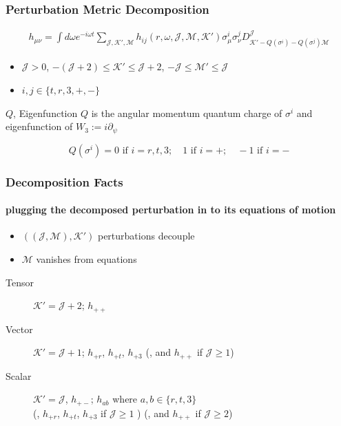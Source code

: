 \documentclass[xcolor=dvipsnames]{beamer}
\begin{document}
\begin{frame}
  \frametitle{Perturbation Metric Decomposition}

  \begin{align*}
    h_{\mu\nu} = \int d\omega e^{-i\omega t} \sum_{\mathcal{J}, \mathcal{K}', \mathcal{M}} h_{i j}(r,\omega, \mathcal{J},\mathcal{M},\mathcal{K}') \sigma^i_{\mu} \sigma^j_{\nu} D_{\mathcal{K'}-Q(\sigma^{i})-Q(\sigma^{j}) \mathcal{M}}^\mathcal{J}
  \end{align*}

  \begin{itemize}
    \item $\mathcal{J} > 0$, $-\left( \mathcal J + 2 \right) \leq \mathcal{K}' \leq \mathcal J + 2$, $-\mathcal J \leq \mathcal{M}'  \leq \mathcal J$
    \item $i, j \in \{t,r,3,+, -\}$
  \end{itemize}

  \begin{block}{$Q$, Eigenfunction}
    \alert{$Q$} is the angular momentum quantum charge of $\sigma^i$ and eigenfunction of $W_3 := i\partial_\psi$

    \begin{equation*}
      Q(\sigma^i) = 0 \text{ if } i=r,t,3;\quad 1 \text{ if } i=+;\quad -1 \text{ if } i=- 
    \end{equation*}
  \end{block}

\end{frame}

\begin{frame}
  \frametitle{Decomposition Facts}
  \framesubtitle{plugging the decomposed perturbation in to its equations of motion}

  \begin{itemize}
    \item $((\mathcal J, \mathcal M), \mathcal K')$ perturbations decouple
    \item $\mathcal M$ vanishes from equations
  \end{itemize}

  \vfill

  \begin{description}
    \item[Tensor]
      \(\mathcal K' = \mathcal J + 2\); \(h_{++}\)
    \item[Vector]
      \(\mathcal K' = \mathcal J + 1\); \(h_{+r}\), \(h_{+t}\), \(h_{+3}\) (,
      and \(h_{++}\) if \(\mathcal J \geq 1\))
    \item[Scalar]
      \(\mathcal K' = \mathcal J\), \(h_{+-}\); \(h_{ab}\) where
      \(a,b \in \{r,t,3\}\)\\
      (, \(h_{+r}\), \(h_{+t}\), \(h_{+3}\) if \(\mathcal J \geq 1\) ) (, and
      \(h_{++}\) if \(\mathcal J \geq 2\))
  \end{description}
\end{frame}
\end{document}
